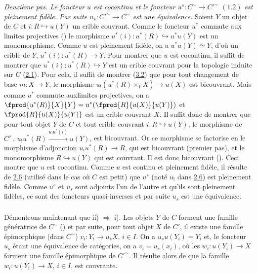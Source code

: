 \noindent \emph{Deuxième pas. Le foncteur $u$ est cocontinu et le
foncteur $u^s:C^{\sim}\rightarrow {C'}^{\sim}$ $(\hyperref[III.prop1.2]{1.2})$
est pleinement fidèle. Par suite $u_s:{C'}^{\sim}\rightarrow
C^{\sim}$ est une équivalence.} Soient $Y$ un objet de $C$ et
$i:R\hookrightarrow u(Y)$ un crible couvrant. Comme le foncteur
$u^{\ast}$ commute aux limites projectives () le
morphisme $u^{\ast}(i):u^{\ast}(R)\hookrightarrow u^{\ast}u(Y)$ est
un monomorphisme. Comme $u$ est pleinement fidèle, on a
$u^{\ast}u(Y)\simeq Y$, d'où un crible de $Y$,
$u^{\ast}(i):u^{\ast}(R)\rightarrow Y$. Pour montrer que $u$ est
cocontinu, il suffit de montrer que
$u^{\ast}(i):u^{\ast}(R)\hookrightarrow Y$ est un crible couvrant
pour la topologie induite sur $C$ (\hyperref[III.def2.1]{2.1}). Pour cela, il
suffit de montrer (\hyperref[III.prop3.2]{3.2}) que pour tout changement de
base $m:X\rightarrow Y$, le morphisme $u_{!}(u^{\ast}(R)\times_Y
X)\rightarrow u(X)$ est bicouvrant. Mais comme $u^{\ast}$ commute
aux\pageoriginale limites projectives, on a
$\fprod{u^{\ast}(R)}{X}{Y}=u^{\ast}(\fprod{R}{u(X)}{u(Y)})$ et
$\fprod{R}{u(X)}{u(Y)}$ est un crible couvrant $X$. Il suffit donc
de montrer que pour tout objet $Y$ de $C$ et tout crible couvrant
$i:R\hookrightarrow u(Y)$, le morphisme de
${C'}^{\widehat{\phantom{,}}}$,
$u_{!}u^{\ast}(R)\xrightarrow{u_{!}u^{\ast}(i)} u(Y)$, est
bicouvrant. Or ce morphisme se factorise en le morphisme
d'adjonction $u_{!}u^{\ast}(R)\rightarrow R$, qui est bicouvrant
(premier pas), et le monomorphisme $R\hookrightarrow u(Y)$ qui est
couvrant. Il est donc bicouvrant (). Ceci montre que
$u$ est cocontinu. Comme $u$ est continu et pleinement fidèle, il
résulte de \hyperref[III.prop2.6]{2.6} (utilisé dans le cas où $C$ est
petit) que $u^s$ (noté $u_{!}$ dans \hyperref[III.prop2.6]{2.6}) est
pleinement fidèle. Comme $u^s$ et $u_s$ sont adjoints l'un de
l'autre et qu'ils sont pleinement fidèles, ce sont des foncteurs
quasi-inverses et par suite $u_s$ est une équivalence.

\setcounter{subsection}{1}
\subsubsection{}
Démontrons maintenant que ii) $\Rightarrow$ i). Les objets $Y$
de $C$ forment une famille génératrice de $C^{\sim}$
() et par suite, pour tout objet $X$ de $C'$, il
existe une famille épimorphique (dans $C^{\sim}$)
$v_i:Y_i\rightarrow u_s X$, $i\in I$. On a $u_su(Y_i)=Y_i$ et, le
foncteur $u_s$ étant une équivalence de catégories, on a
$v_i=u_s(x_i)$, où les $w_i:u(Y_i)\rightarrow X$ forment une
famille épimorphique de ${C'}^{\sim}$. Il résulte alors de
 que la famille $w_i:u(Y_i)\rightarrow X$, $i\in I$,
est couvrante.

